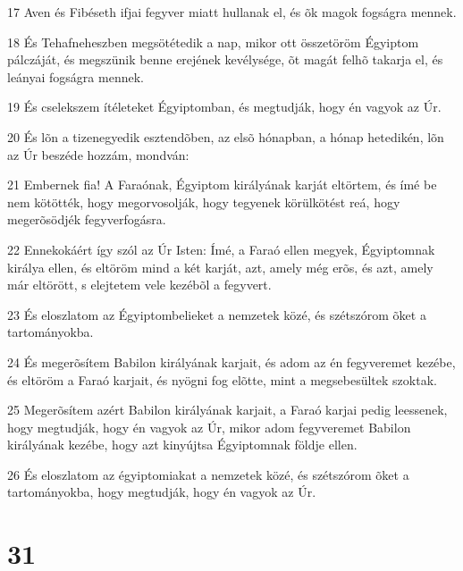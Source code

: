 \par 17 Aven és Fibéseth ifjai fegyver miatt hullanak el, és õk magok fogságra mennek.
\par 18 És Tehafneheszben megsötétedik a nap, mikor ott összetöröm Égyiptom pálczáját, és megszünik benne erejének kevélysége, õt magát felhõ takarja el, és leányai fogságra mennek.
\par 19 És cselekszem ítéleteket Égyiptomban, és megtudják, hogy én vagyok az Úr.
\par 20 És lõn a tizenegyedik esztendõben, az elsõ hónapban, a hónap hetedikén, lõn az Úr beszéde hozzám, mondván:
\par 21 Embernek fia! A Faraónak, Égyiptom királyának karját eltörtem, és ímé be nem kötötték, hogy megorvosolják, hogy tegyenek körülkötést reá, hogy megerõsödjék fegyverfogásra.
\par 22 Ennekokáért így szól az Úr Isten: Ímé, a Faraó ellen megyek, Égyiptomnak királya ellen, és eltöröm mind a két karját, azt, amely még erõs, és azt, amely már eltörött, s elejtetem vele kezébõl a fegyvert.
\par 23 És eloszlatom az Égyiptombelieket a nemzetek közé, és szétszórom õket a tartományokba.
\par 24 És megerõsítem Babilon királyának karjait, és adom az én fegyveremet kezébe, és eltöröm a Faraó karjait, és nyögni fog elõtte, mint a megsebesültek szoktak.
\par 25 Megerõsítem azért Babilon királyának karjait, a Faraó karjai pedig leessenek, hogy megtudják, hogy én vagyok az Úr, mikor adom fegyveremet Babilon királyának kezébe, hogy azt kinyújtsa Égyiptomnak földje ellen.
\par 26 És eloszlatom az égyiptomiakat a nemzetek közé, és szétszórom õket a tartományokba, hogy megtudják, hogy én vagyok az Úr.

\chapter{31}

